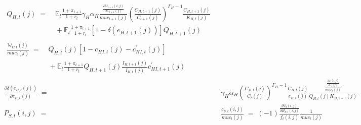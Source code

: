 \documentclass[12pt,3p,authoryear,review]{elsarticle}
\begin{document}
\begin{small}
\begin{align}
		\begin{split}%
			Q_{H,t}(j) \; = & \; \mathbb{E}_t \frac{1+\pi_{t+1}}{1+r_t} \gamma_H \alpha_H \frac{\frac{\partial \mathbb{U}_{t+1}(i,j)}{\partial C_{t+1}(j)}}{muc_{t+1}(j)} \left(\frac{C_{H,t+1}(j)}{C_{t+1}(j)}\right)^{\Gamma_H-1} \frac{C_{H,t+1}(j)}{K_{H,t}(j)}\\%
			& \; + \mathbb{E}_t \frac{1+\pi_{t+1}}{1+r_t} \left[1-\delta\left(e_{H,t+1}(j)\right)\right] Q_{H,t+1}(j)%
		\end{split}\\%
		\begin{split}%
			\frac{\mathbb{W}_{C,t}(j)}{muc_t(j)} \; = & \; Q_{H,t}(j) \left[ 1- c_{HI,t}(j) - c^{\prime}_{HI,t}(j) \right]\\%
			& \; + \mathbb{E}_t \frac{1+\pi_{t+1}}{1+r_t} Q_{H,t+1} (j) \frac{I_{H,t+1}(j)}{I_{H,t}(j)} c^{\prime}_{HI,t+1}(j)%
		\end{split}\\%
		\frac{\partial \delta \left(e_{H,t}(j)\right)}{\partial e_{H,t}(j)} \; = & \; \gamma_H \alpha_H \left(\frac{C_{H,t}(j)}{C_t(j)}\right)^{\Gamma_H-1} \frac{C_{H,t}(j)}{e_{H,t}(j)} \frac{\frac{\frac{\partial \mathbb{U}_t(i,j)}{\partial C_t(j)}}{muc_t(j)}}{Q_{H,t}(j) K_{H,t-1}(j)}\\%
		P_{S,t}(i,j) \; = & \; \frac{c^{\prime}_{S,t}(i,j)}{muc_t(j)} \; = \; (-1) \frac{\frac{\partial \mathbb{U}_t(i,j)}{\partial H_{S,t}(i,j)}}{f_t(i,j)} \frac{1}{muc_t(j)}%
	\end{align}%
\end{small}%
\pagebreak%
\end{document}
